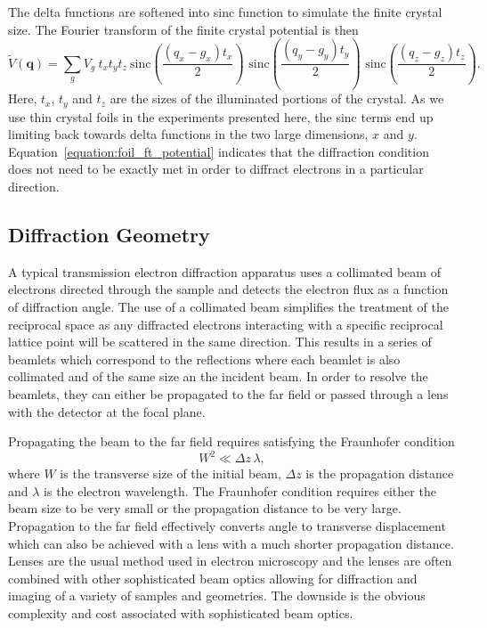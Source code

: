 The delta functions are softened into sinc function to simulate the finite crystal size.
The Fourier transform of the finite crystal potential is then
\begin{equation}\label{equation:foil_ft_potential}
\tilde{V}(\mathbf{q}) = \sum_g V_g \: t_x  t_y  t_z \: \text{sinc}{\left( \frac{(q_x-g_x)t_x}{2} \right)} \,\, \text{sinc}{\left( \frac{(q_y-g_y)t_y}{2} \right)} \,\, \text{sinc}{\left( \frac{(q_z-g_z)t_z}{2} \right)}.
\end{equation}
Here, $t_x$, $t_y$ and $t_z$ are the sizes of the illuminated portions of the crystal.
As we use thin crystal foils in the experiments presented here, the sinc terms end up limiting back towards delta functions in the two large dimensions, $x$ and $y$.
Equation~\ref{equation:foil_ft_potential} indicates that the diffraction condition does not need to be exactly met in order to diffract electrons in a particular direction.

\subsection{Diffraction Geometry}

A typical transmission electron diffraction apparatus uses a collimated beam of electrons directed through the sample and detects the electron flux as a function of diffraction angle.
The use of a collimated beam simplifies the treatment of the reciprocal space as any diffracted electrons interacting with a specific reciprocal lattice point will be scattered in the same direction.
This results in a series of beamlets which correspond to the reflections where each beamlet is also collimated and of the same size an the incident beam.
In order to resolve the beamlets, they can either be propagated to the far field or passed through a lens with the detector at the focal plane.

Propagating the beam to the far field requires satisfying the Fraunhofer condition
\begin{equation}
W^2 \ll \Delta z\,\lambda,
\end{equation}
where $W$ is the transverse size of the initial beam, $\Delta z$ is the propagation distance and $\lambda$ is the electron wavelength.
The Fraunhofer condition requires either the beam size to be very small or the propagation distance to be very large.
Propagation to the far field effectively converts angle to transverse displacement which can also be achieved with a lens with a much shorter propagation distance.
Lenses are the usual method used in electron microscopy and the lenses are often combined with other sophisticated beam optics allowing for diffraction and imaging of a variety of samples and geometries.
The downside is the obvious complexity and cost associated with sophisticated beam optics.

